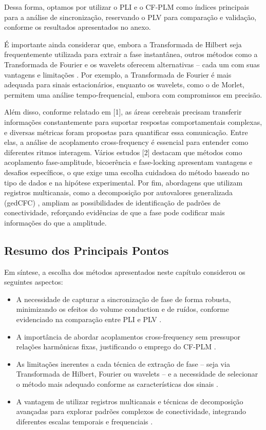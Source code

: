 Dessa forma, optamos por utilizar o PLI e o CF-PLM como índices principais para a análise de sincronização, reservando o PLV para comparação e validação, conforme os resultados apresentados no anexo.

É importante ainda considerar que, embora a Transformada de Hilbert seja frequentemente utilizada para extrair a fase instantânea, outros métodos como a Transformada de Fourier e os wavelets oferecem alternativas – cada um com suas vantagens e limitações \cite{ref3}. Por exemplo, a Transformada de Fourier é mais adequada para sinais estacionários, enquanto os wavelets, como o de Morlet, permitem uma análise tempo-frequencial, embora com compromissos em precisão.

Além disso, conforme relatado em [1], as áreas cerebrais precisam transferir informações constantemente para suportar respostas comportamentais complexas, e diversas métricas foram propostas para quantificar essa comunicação. Entre elas, a análise de acoplamento cross-frequency é essencial para entender como diferentes ritmos interagem. Vários estudos [2] destacam que métodos como acoplamento fase-amplitude, bicoerência e fase-locking apresentam vantagens e desafios específicos, o que exige uma escolha cuidadosa do método baseado no tipo de dados e na hipótese experimental. Por fim, abordagens que utilizam registros multicanais, como a decomposição por autovalores generalizada (gedCFC) \cite{ref1, ref2}, ampliam as possibilidades de identificação de padrões de conectividade, reforçando evidências de que a fase pode codificar mais informações do que a amplitude.

\subsection{Resumo dos Principais Pontos}

Em síntese, a escolha dos métodos apresentados neste capítulo considerou os seguintes aspectos:

\begin{itemize}
  \item A necessidade de capturar a sincronização de fase de forma robusta, minimizando os efeitos do volume conduction e de ruídos, conforme evidenciado na comparação entre PLI e PLV \cite{seraj2018cerebral, ref7}.
  \item A importância de abordar acoplamentos cross-frequency sem pressupor relações harmônicas fixas, justificando o emprego do CF-PLM \cite{sorrentino2022detection, ref3, cohen2017multivariate}.
  \item As limitações inerentes a cada técnica de extração de fase – seja via Transformada de Hilbert, Fourier ou wavelets – e a necessidade de selecionar o método mais adequado conforme as características dos sinais \cite{ref3}.
  \item A vantagem de utilizar registros multicanais e técnicas de decomposição avançadas para explorar padrões complexos de conectividade, integrando diferentes escalas temporais e frequenciais \cite{ref1, ref2}.
\end{itemize}

